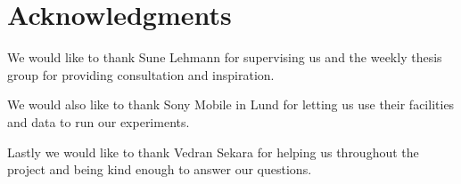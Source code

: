\chapter{Acknowledgments}
We would like to thank Sune Lehmann for supervising us and the weekly thesis group for providing consultation and inspiration.

We would also like to thank Sony Mobile in Lund for letting us use their facilities and data to run our experiments.

Lastly we would like to thank Vedran Sekara for helping us throughout the project and being kind enough to answer our questions.


